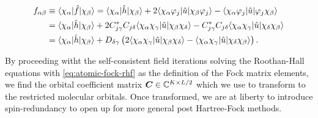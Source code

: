             \begin{align}
                f_{\alpha\beta}
                &\equiv \langle \chi_{\alpha} |\hat{f}| \chi_{\beta} \rangle
                =
                \langle \chi_{\alpha} |\hat{h}| \chi_{\beta} \rangle
                +
                2 \langle \chi_{\alpha}\varphi_j |
                \hat{u}
                | \chi_{\beta}\varphi_j \rangle
                - \langle \chi_{\alpha}\varphi_j |
                \hat{u}
                | \varphi_j\chi_{\beta} \rangle
                \\
                &=
                \langle \chi_{\alpha} |\hat{h}| \chi_{\beta} \rangle
                + 2 C^{*}_{j\gamma} C_{j\delta}
                \langle \chi_{\alpha}\chi_{\gamma} |
                \hat{u}
                | \chi_{\beta}\chi_{\delta} \rangle
                - C^{*}_{j\gamma} C_{j\delta}
                \langle \chi_{\alpha}\chi_{\gamma} |
                \hat{u}
                | \chi_{\delta}\chi_{\beta} \rangle
                \\
                &=
                \langle \chi_{\alpha} |\hat{h}| \chi_{\beta} \rangle
                + D_{\delta\gamma}
                \left( 
                    2
                    \langle \chi_{\alpha}\chi_{\gamma} |
                    \hat{u}
                    | \chi_{\beta}\chi_{\delta} \rangle
                    -
                    \langle \chi_{\alpha}\chi_{\gamma} |
                    \hat{u}
                    | \chi_{\delta}\chi_{\beta} \rangle
                 \right).
                \label{eq:atomic-fock-rhf}
            \end{align}

            By proceeding witht the self-consistent field iterations solving the
            Roothan-Hall equations with \autoref{eq:atomic-fock-rhf} as the
            definition of the Fock matrix elements, we find the orbital
            coefficient matrix $\boldsymbol{C} \in \mathbb{C}^{K \times L/2}$ which we
            use to transform to the restricted molecular orbitals.
            Once transformed, we are at liberty to introduce spin-redundancy to
            open up for more general post Hartree-Fock methods.

